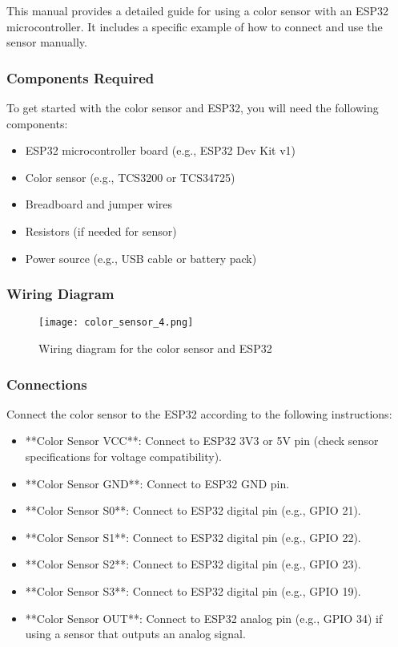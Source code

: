 This manual provides a detailed guide for using a color sensor with an ESP32 microcontroller. It includes a specific example of how to connect and use the sensor manually.

\subsubsection{Components Required}

To get started with the color sensor and ESP32, you will need the following components:

\begin{itemize}
	\item ESP32 microcontroller board (e.g., ESP32 Dev Kit v1)
	\item Color sensor (e.g., TCS3200 or TCS34725)
	\item Breadboard and jumper wires
	\item Resistors (if needed for sensor)
	\item Power source (e.g., USB cable or battery pack)
\end{itemize}

\subsubsection{Wiring Diagram}

\begin{figure}[h!]
	\centering
	\texttt{[image: color\_sensor\_4.png]}
	\caption{Wiring diagram for the color sensor and ESP32}
	\label{fig:wiring}
\end{figure}

\subsubsection{Connections}

Connect the color sensor to the ESP32 according to the following instructions:

\begin{itemize}
	\item **Color Sensor VCC**: Connect to ESP32 3V3 or 5V pin (check sensor specifications for voltage compatibility).
	\item **Color Sensor GND**: Connect to ESP32 GND pin.
	\item **Color Sensor S0**: Connect to ESP32 digital pin (e.g., GPIO 21).
	\item **Color Sensor S1**: Connect to ESP32 digital pin (e.g., GPIO 22).
	\item **Color Sensor S2**: Connect to ESP32 digital pin (e.g., GPIO 23).
	\item **Color Sensor S3**: Connect to ESP32 digital pin (e.g., GPIO 19).
	\item **Color Sensor OUT**: Connect to ESP32 analog pin (e.g., GPIO 34) if using a sensor that outputs an analog signal.
\end{itemize}

